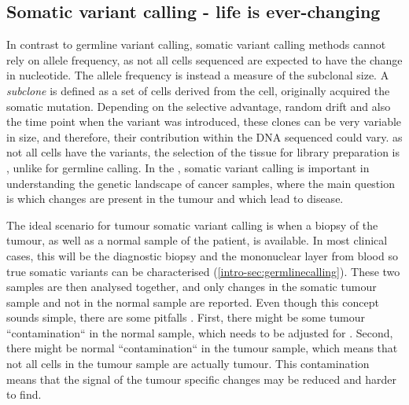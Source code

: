 \subsection[Somatic]{Somatic variant calling - life is ever-changing}
\label{intro-sec:somaticcalling}
In contrast to germline variant calling, somatic variant calling methods cannot rely on allele frequency, as not all cells sequenced are expected to have the  change in nucleotide. The allele frequency is instead a measure of the subclonal size. A \textit{subclone} is defined as a set of cells derived from the cell,  originally acquired the somatic mutation. Depending on the selective advantage, random drift and also the time point when the variant was introduced, these clones can be very variable in size, and therefore, their contribution within the DNA sequenced could vary.
 as not all cells have the variants, the selection of the tissue for library preparation is , unlike for germline calling. 
In the , somatic variant calling is important in understanding the genetic landscape of cancer samples, where the main question is which changes are present in the tumour and which lead to disease.

The ideal scenario for tumour somatic variant calling is when a biopsy of the tumour, as well as a normal sample of the patient, is available. In most clinical cases, this will be the diagnostic biopsy and the mononuclear layer from blood\remove{,} so  true somatic variants can be characterised (\autoref{intro-sec:germlinecalling}). 
These two samples are then analysed together, and only changes  in the somatic tumour sample and not in the normal sample are reported. Even though this concept sounds simple, there are some pitfalls \cite{GATKTeam2021a}. First, there might be some tumour ``contamination`` in the normal sample, which needs to be adjusted for \cite{Kim2018,TaylorWeiner2018}. Second, there might be normal ``contamination`` in the tumour sample, which means that not all cells in the tumour sample are actually tumour. This contamination means that the signal of the tumour specific changes may be reduced and harder to find.

